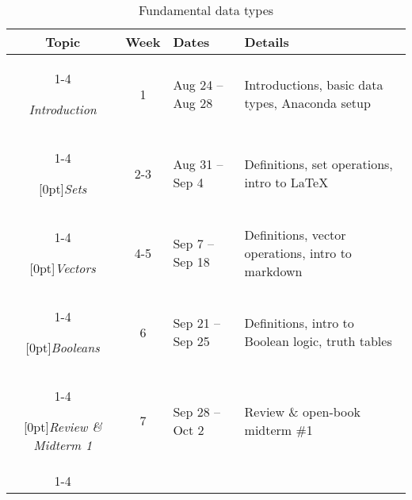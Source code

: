 \documentclass[10pt]{memoir}
\begin{document}
\begin{table}[htb!]
\centering
\begin{tabular}{ccll}
    \textbf{Topic} & \textbf{Week} & \textbf{Dates} & \textbf{Details} \\
    \cmidrule[.1em](lr){1-4}
    
    \textit{Introduction} & 1 & Aug 24 -- Aug 28 & Introductions, basic data types, Anaconda setup \\
    \cmidrule[.1em](lr){1-4} 
 
     \multirow{1}{*}[0pt]{\textit{Sets}} %
        & 2-3 & Aug 31 -- Sep 4 & Definitions, set operations, intro to \LaTeX \\ 
        \cmidrule[.1em](lr){1-4}
        
    \multirow{1}{*}[0pt]{\textit{Vectors}} %
        & 4-5 & Sep 7 -- Sep 18 & Definitions, vector operations, intro to markdown \\ \cmidrule[.1em](lr){1-4}

    \multirow{1}{*}[0pt]{\textit{Booleans}} %
        & 6 & Sep 21 -- Sep 25 & Definitions, intro to Boolean logic, truth tables \\   \cmidrule[.1em](lr){1-4}    

   \multirow{1}{*}[0pt]{\textit{Review \& Midterm 1}} %
        & 7 & Sep 28 -- Oct 2 & Review \& open-book midterm \#1 \\ \cmidrule[.1em](lr){1-4}             

\end{tabular}\\
\caption{Fundamental data types}
\end{table}

\end{document}

